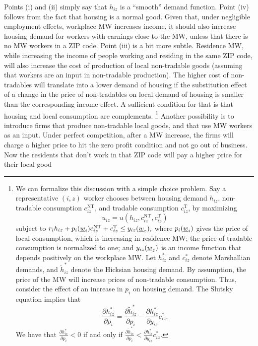 Points (i) and (ii) simply say that $h_{iz}$ is a ``smooth'' demand function.
Point (iv) follows from the fact that housing is a normal good.
Given that, under negligible employment effects, workplace MW increases income, 
it should also increase housing demand for workers with earnings close to the MW,
unless that there is no MW workers in a ZIP code.
Point (iii) is a bit more subtle.
Residence MW, while increasing the income of people working and residing in the 
same ZIP code, will also increase the cost of production of local non-tradable 
goods (assuming that workers are an input in non-tradable production).
The higher cost of non-tradables will translate into a lower demand of housing 
if the substitution effect of a change in the price of non-tradables on local demand 
of housing is smaller than the corresponding income effect.
A sufficient condition for that is that housing and local consumption are complements.%
\footnote{We can formalize this discussion with a simple choice problem.
Say a representative $(i,z)$ worker chooses between housing demand $h_{iz}$,
non-tradable consumption $c^{\text{NT}}_{iz}$, and tradable consumption $c^{\text{T}}_{iz}$,
by maximizing
$$u_{iz} = u \left(h_{iz}, c^{\text{NT}}_{iz}, c^{\text{T}}_{iz}\right)$$
subject to 
$r_i h_{iz} + p_i(\underline{w}_i) c^{\text{NT}}_{iz} + c^{\text{T}}_{iz} \leq y_{iz}(\underline{w}_z),$
where $p_i(\underline{w}_i)$ gives the price of local consumption, which is increasing in residence MW;
the price of tradable consumption is normalized to one; and 
$y_{iz}(\underline{w}_z)$ is an income function that depends positively on the workplace MW.
Let $h_{iz}^*$ and $c_{iz}^*$ denote Marshallian demands, and 
$\tilde h_{iz}^*$ denote the Hicksian housing demand.
By assumption, the price of the MW will increase prices of non-tradable consumption.
Thus, consider the effect of an increase in $p_i$ on housing demand.
The Slutsky equation implies that
$$\frac{\partial h_{iz}^*}{\partial p_i} 
   = \frac{\partial \tilde h_{iz}^*}{\partial p_i} 
   - \frac{\partial h_{iz}^*}{\partial y_{iz}} c_{iz}^*.$$
We have that $\frac{\partial h_{iz}^*}{\partial p_i} < 0$ if and only if 
$\frac{\partial \tilde h_{iz}^*}{\partial p_i} 
< \frac{\partial h_{iz}^*}{\partial y_{iz}} c_{iz}^*$.}
Another possibility is to introduce firms that produce non-tradable local goods, and that 
use MW workers as an input. Under perfect competition, after a MW increase, the firms will 
charge a higher price to hit the zero profit condition and not go out of business. Now the 
residents that don't work in that ZIP code will pay a higher price for their local good 
